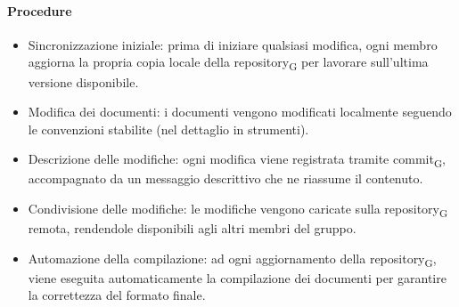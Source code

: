 \documentclass[11pt,a4paper]{article}
\newcommand{\gls}[1]{#1\textsubscript{G}}
\begin{document}
\paragraph{Procedure}
\begin{itemize}
\item Sincronizzazione iniziale: prima di iniziare qualsiasi modifica, ogni membro aggiorna la propria copia locale della \gls{repository} per lavorare sull’ultima versione disponibile.
\item Modifica dei documenti: i documenti vengono modificati localmente seguendo le convenzioni stabilite (nel dettaglio in strumenti).
\item Descrizione delle modifiche: ogni modifica viene registrata tramite \gls{commit}, accompagnato da un messaggio descrittivo che ne riassume il contenuto.
\item Condivisione delle modifiche: le modifiche vengono caricate sulla \gls{repository} remota, rendendole disponibili agli altri membri del gruppo.

\item Automazione della compilazione: ad ogni aggiornamento della \gls{repository}, viene eseguita automaticamente la compilazione dei documenti per garantire la correttezza del formato finale.
\end{itemize}
\end{document}
